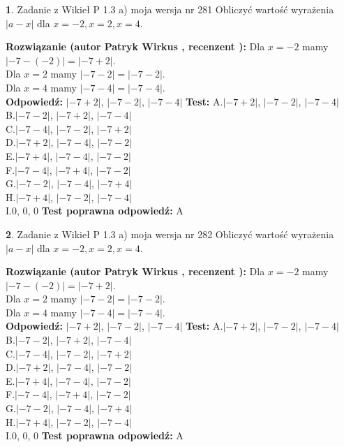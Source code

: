 \documentclass[12pt, a4paper]{article}
\theoremstyle{definition} %
\newtheorem{zad}{}
\newcommand{\zadStart}[1]{\begin{zad}#1\newline}
\newcommand{\zadStop}{\end{zad}}
\newcommand{\rozwStart}[2]{\noindent \textbf{Rozwiązanie (autor #1 , recenzent #2): }\newline}
\newcommand{\rozwStop}{\newline}
\newcommand{\odpStart}{\noindent \textbf{Odpowiedź:}\newline}
\newcommand{\odpStop}{\newline}
\newcommand{\testStart}{\noindent \textbf{Test:}\newline}
\newcommand{\testStop}{\newline}
\newcommand{\kluczStart}{\noindent \textbf{Test poprawna odpowiedź:}\newline}
\newcommand{\kluczStop}{\newline}
\begin{document}
\zadStart{Zadanie z Wikieł P 1.3 a) moja wersja nr 281}
Obliczyć wartość wyrażenia $|a - x|$ dla $x=-2,x=2,x=4$.
\zadStop
\rozwStart{Patryk Wirkus}{}
Dla $x = -2$ mamy $|-7 - (-2)| = |-7 + 2|$.\\
Dla $x = 2$ mamy $|-7 - 2| = |-7 - 2|$.\\
Dla $x = 4$ mamy $|-7 - 4| = |-7 - 4|$.\\
\rozwStop
\odpStart
$|-7 + 2|$, $|-7 - 2|$, $|-7 - 4|$
\odpStop
\testStart
A.$|-7 + 2|$, $|-7 - 2|$, $|-7 - 4|$\\
B.$|-7 - 2|$, $|-7 + 2|$, $|-7 - 4|$\\
C.$|-7 - 4|$, $|-7 - 2|$, $|-7 + 2|$\\
D.$|-7 + 2|$, $|-7 - 4|$, $|-7 - 2|$\\
E.$|-7 + 4|$, $|-7 - 4|$, $|-7 - 2|$\\
F.$|-7 - 4|$, $|-7 + 4|$, $|-7 - 2|$\\
G.$|-7 - 2|$, $|-7 - 4|$, $|-7 + 4|$\\
H.$|-7 + 4|$, $|-7 - 2|$, $|-7 - 4|$\\
I.$0$, $0$, $0$
\testStop
\kluczStart
A
\kluczStop



\zadStart{Zadanie z Wikieł P 1.3 a) moja wersja nr 282}
Obliczyć wartość wyrażenia $|a - x|$ dla $x=-2,x=2,x=4$.
\zadStop
\rozwStart{Patryk Wirkus}{}
Dla $x = -2$ mamy $|-7 - (-2)| = |-7 + 2|$.\\
Dla $x = 2$ mamy $|-7 - 2| = |-7 - 2|$.\\
Dla $x = 4$ mamy $|-7 - 4| = |-7 - 4|$.\\
\rozwStop
\odpStart
$|-7 + 2|$, $|-7 - 2|$, $|-7 - 4|$
\odpStop
\testStart
A.$|-7 + 2|$, $|-7 - 2|$, $|-7 - 4|$\\
B.$|-7 - 2|$, $|-7 + 2|$, $|-7 - 4|$\\
C.$|-7 - 4|$, $|-7 - 2|$, $|-7 + 2|$\\
D.$|-7 + 2|$, $|-7 - 4|$, $|-7 - 2|$\\
E.$|-7 + 4|$, $|-7 - 4|$, $|-7 - 2|$\\
F.$|-7 - 4|$, $|-7 + 4|$, $|-7 - 2|$\\
G.$|-7 - 2|$, $|-7 - 4|$, $|-7 + 4|$\\
H.$|-7 + 4|$, $|-7 - 2|$, $|-7 - 4|$\\
I.$0$, $0$, $0$
\testStop
\kluczStart
A
\kluczStop
\end{document}
